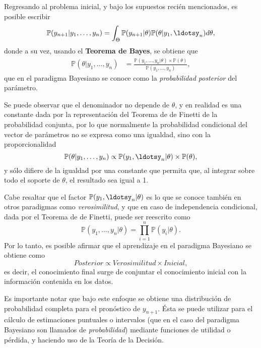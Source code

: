 Regresando al problema inicial, y bajo los supuestos reci\'en mencionados, es posible escribir
\begin{equation*}
    \mathbb{P}(y_{n+1} | y_1,\ldots,y_n) =
    \int_{\Theta} 
    \mathbb{P}(y_{n+1}|\theta) \mathbb{P}(\theta|y_1,\ldotsy_n)d\theta,
\end{equation*}
donde a su vez, usando el \textbf{Teorema de Bayes}, se obtiene que
\begin{equation*}
\begin{aligned}
    \mathbb{P}(\theta|y_1,\ldots,y_n) &=
    \frac{\mathbb{P}(y_1,\ldots,y_n|\theta)\times\mathbb{P}(\theta)}
    {\mathbb{P}(y_1,\ldots,y_n)},
\end{aligned}
\end{equation*}
que en el paradigma Bayesiano se conoce como la \textit{probabilidad posterior} del par\'ametro. 

Se puede observar que el denominador no depende de $\theta$, y en realidad es una constante dada por la representaci\'on del Teorema de de Finetti de la probabilidad conjunta, por lo que normalmente la probabilidad condicional del vector de par\'ametros no se expresa como una igualdad, sino con la proporcionalidad
\begin{equation*}
    \mathbb{P}(\theta|y_1,\ldots,y_n) 
    \propto 
    \mathbb{P}(y_1,\ldotsy_n|\theta) \times \mathbb{P}(\theta),
\end{equation*}
y s\'olo difiere de la igualdad por una constante que permita que, al integrar sobre todo el soporte de $\theta$, el resultado sea igual a 1.

Cabe resaltar que el factor $\mathbb{P}(y_1,\ldotsy_n|\theta)$ es lo que se conoce tambi\'en en otros paradigmas como \textit{verosimilitud}, y que en caso de independencia condicional, dada por el Teorema de de Finetti, puede ser reescrito como
\begin{equation*}
    \mathbb{P}(y_1,\ldots,y_n|\theta)  = \prod_{i=1}^n \mathbb{P}(y_i|\theta).
\end{equation*}
Por lo tanto, es posible afirmar que el aprendizaje en el paradigma Bayesiano se obtiene como
\begin{equation*}
    Posterior \propto Verosimilitud \times Inicial,
\end{equation*}
es decir, el conocimiento final surge de conjuntar el conocimiento inicial con la informaci\'on contenida en los datos.

Es importante notar que bajo este enfoque se obtiene una distribuci\'on de probabilidad completa para  el pron\'ostico de $y_{n+1}$. \'Esta se puede utilizar para el c\'alculo de estimaciones puntuales o intervalos (que en el caso del paradigma Bayesiano son llamados de \textit{probabilidad}) mediante funciones de utilidad o p\'erdida, y haciendo uso de la Teor\'ia de la Decisi\'on.


